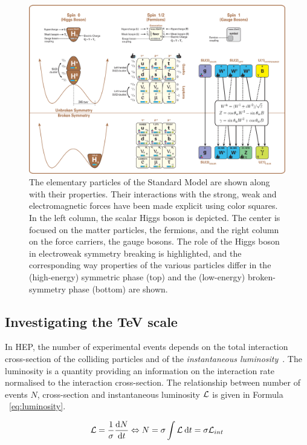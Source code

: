 	\begin{figure}[H]
		\centering
		\hspace*{-0.1\linewidth}
		\includegraphics[width=1.2\linewidth]{fig/chapt2/Standard_Model_Of_Particle_Physics.png}
		\caption{\label{fig:SM} The elementary particles of the Standard Model are shown along with their properties. Their interactions with the strong, weak and electromagnetic forces have been made explicit using color squares. In the left column, the scalar Higgs boson is depicted. The center is focused on the matter particles, the fermions, and the right column on the force carriers, the gauge bosons. The role of the Higgs boson in electroweak symmetry breaking is highlighted, and the corresponding way properties of the various particles differ in the (high-energy) symmetric phase (top) and the (low-energy) broken-symmetry phase (bottom) are shown.}
	\end{figure}
	
	\subsection{Investigating the TeV scale}
	\label{chapt2:ssec:TeV}
	
	In \acl{HEP}, the number of experimental events depends on the total interaction cross-section of the colliding particles and of the \textit{instantaneous luminosity}~\cite{PDG2018}. The luminosity is a quantity providing an information on the interaction rate normalised to the interaction cross-section. The relationship between number of events $N$, cross-section and instantaneous luminosity $\mathcal{L}$ is given in Formula ~\ref{eq:luminosity}.
	
	\begin{equation}
		\label{eq:luminosity}
		\mathcal{L} = \frac{1}{\sigma}\frac{\mathrm{d} N}{\mathrm{d} t} \Leftrightarrow N = \sigma \int \mathcal{L}\: \mathrm{d} t = \sigma \mathcal{L}_{int}
	\end{equation}
	
